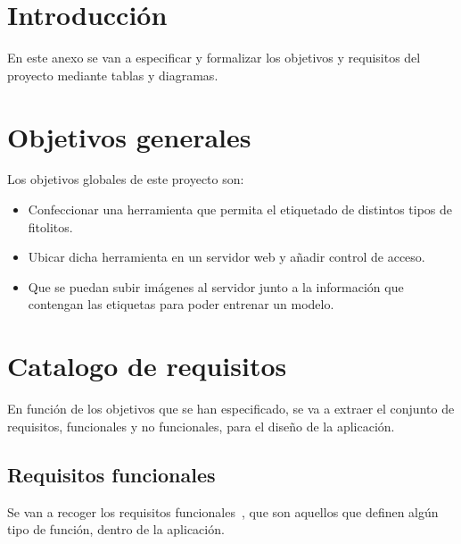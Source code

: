 
\section{Introducción}
En este anexo se van a especificar y formalizar los objetivos y requisitos del proyecto mediante tablas y diagramas.

\section{Objetivos generales}
Los objetivos globales de este proyecto son:
\begin{itemize}
	\item Confeccionar una herramienta que permita el etiquetado de distintos tipos de fitolitos.
	
	\item Ubicar dicha herramienta en un servidor web y añadir control de acceso.
	
	\item Que se puedan subir imágenes al servidor junto a la información que contengan las etiquetas para poder entrenar un modelo.

\end{itemize}
\section{Catalogo de requisitos}
En función de los objetivos que se han especificado, se va a extraer el conjunto de requisitos, funcionales y no funcionales, para el diseño de la aplicación.

\subsection{Requisitos funcionales}
Se van a recoger los requisitos funcionales~\cite{fun}, que son aquellos que definen algún tipo de función, dentro de la aplicación.

